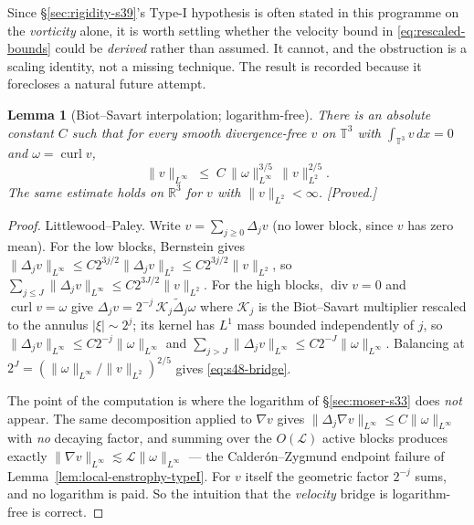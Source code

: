 \documentclass[11pt]{article}
\newtheorem{lemma}[theorem]{Lemma}
\theoremstyle{definition}
\theoremstyle{remark}
\newcommand{\R}{\mathbb{R}}
\newcommand{\T}{\mathbb{T}}
\newcommand{\curl}{\operatorname{curl}}
\begin{document}
Since \S\ref{sec:rigidity-s39}'s Type-I hypothesis is often stated in this
programme on the \emph{vorticity} alone, it is worth settling whether the
velocity bound in \eqref{eq:rescaled-bounds} could be \emph{derived} rather
than assumed. It cannot, and the obstruction is a scaling identity, not a
missing technique. The result is recorded because it forecloses a natural
future attempt.

\begin{lemma}[Biot--Savart interpolation; logarithm-free]
  \label{lem:s48-biotsavart}
  There is an absolute constant $C$ such that for every smooth
  divergence-free $v$ on $\T^3$ with $\int_{\T^3}v\,dx=0$ and
  $\omega=\curl v$,
  \begin{equation}\label{eq:s48-bridge}
    \|v\|_{L^\infty} \;\leq\; C\,\|\omega\|_{L^\infty}^{3/5}\,
      \|v\|_{L^2}^{2/5}.
  \end{equation}
  The same estimate holds on $\R^3$ for $v$ with $\|v\|_{L^2}<\infty$.
  \emph{[Proved.]}
\end{lemma}
\begin{proof}
  Littlewood--Paley. Write $v=\sum_{j\geq0}\Delta_jv$ (no lower block, since
  $v$ has zero mean). For the low blocks, Bernstein gives
  $\|\Delta_jv\|_{L^\infty}\leq C2^{3j/2}\|\Delta_jv\|_{L^2}
  \leq C2^{3j/2}\|v\|_{L^2}$, so
  $\sum_{j\leq J}\|\Delta_jv\|_{L^\infty}\leq C2^{3J/2}\|v\|_{L^2}$.
  For the high blocks, $\operatorname{div}v=0$ and $\curl v=\omega$ give
  $\Delta_jv=2^{-j}\,\mathcal{K}_j\widetilde\Delta_j\omega$ where
  $\mathcal{K}_j$ is the Biot--Savart multiplier rescaled to the annulus
  $|\xi|\sim2^j$; its kernel has $L^1$ mass bounded independently of $j$, so
  $\|\Delta_jv\|_{L^\infty}\leq C2^{-j}\|\omega\|_{L^\infty}$ and
  $\sum_{j>J}\|\Delta_jv\|_{L^\infty}\leq C2^{-J}\|\omega\|_{L^\infty}$.
  Balancing at $2^J=(\|\omega\|_{L^\infty}/\|v\|_{L^2})^{2/5}$ gives
  \eqref{eq:s48-bridge}.

  The point of the computation is where the logarithm of
  \S\ref{sec:moser-s33} does \emph{not} appear. The same decomposition applied
  to $\nabla v$ gives $\|\Delta_j\nabla v\|_{L^\infty}\leq
  C\|\omega\|_{L^\infty}$ with \emph{no} decaying factor, and summing over the
  $O(\mathcal{L})$ active blocks produces exactly
  $\|\nabla v\|_{L^\infty}\lesssim\mathcal{L}\|\omega\|_{L^\infty}$ --- the
  Calder\'on--Zygmund endpoint failure of
  Lemma~\ref{lem:local-enstrophy-typeI}. For $v$ itself the geometric factor
  $2^{-j}$ sums, and no logarithm is paid. So the intuition that the
  \emph{velocity} bridge is logarithm-free is correct.
\end{proof}
\end{document}
